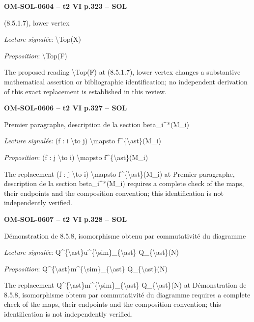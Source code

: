 \par\noindent\textbf{OM-SOL-0604 -- t2 VI p.323 -- SOL}\par
(8.5.1.7), lower vertex\par
\emph{Lecture signalée}: \textbackslash{}Top(X)\par
\emph{Proposition}: \textbackslash{}Top(F)\par
The proposed reading \textbackslash{}Top(F) at (8.5.1.7), lower vertex changes a substantive mathematical assertion or bibliographic identification; no independent derivation of this exact replacement is established in this review.\par
\par\noindent\textbf{OM-SOL-0606 -- t2 VI p.327 -- SOL}\par
Premier paragraphe, description de la section beta\_i\textasciicircum{}*(M\_i)\par
\emph{Lecture signalée}: (f : i \textbackslash{}to j) \textbackslash{}mapsto f\textasciicircum{}\{\textbackslash{}ast\}(M\_i)\par
\emph{Proposition}: (f : j \textbackslash{}to i) \textbackslash{}mapsto f\textasciicircum{}\{\textbackslash{}ast\}(M\_i)\par
The replacement (f : j \textbackslash{}to i) \textbackslash{}mapsto f\textasciicircum{}\{\textbackslash{}ast\}(M\_i) at Premier paragraphe, description de la section beta\_i\textasciicircum{}*(M\_i) requires a complete check of the maps, their endpoints and the composition convention; this identification is not independently verified.\par
\par\noindent\textbf{OM-SOL-0607 -- t2 VI p.328 -- SOL}\par
Démonstration de 8.5.8, isomorphisme obtenu par commutativité du diagramme\par
\emph{Lecture signalée}: Q\textasciicircum{}\{\textbackslash{}ast\}u\textasciicircum{}\{\textbackslash{}sim\}\_\{\textbackslash{}ast\} Q\_\{\textbackslash{}ast\}(N)\par
\emph{Proposition}: Q\textasciicircum{}\{\textbackslash{}ast\}m\textasciicircum{}\{\textbackslash{}sim\}\_\{\textbackslash{}ast\} Q\_\{\textbackslash{}ast\}(N)\par
The replacement Q\textasciicircum{}\{\textbackslash{}ast\}m\textasciicircum{}\{\textbackslash{}sim\}\_\{\textbackslash{}ast\} Q\_\{\textbackslash{}ast\}(N) at Démonstration de 8.5.8, isomorphisme obtenu par commutativité du diagramme requires a complete check of the maps, their endpoints and the composition convention; this identification is not independently verified.\par
